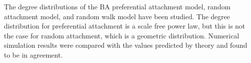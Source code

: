 The degree distributions of the BA preferential attachment model, random attachment model, and random walk model have been studied. The degree distribution for preferential attachment is a scale free power law, but this is not the case for random attachment, which is a geometric distribution. Numerical simulation results were compared with the values predicted by theory and found to be in agreement. 